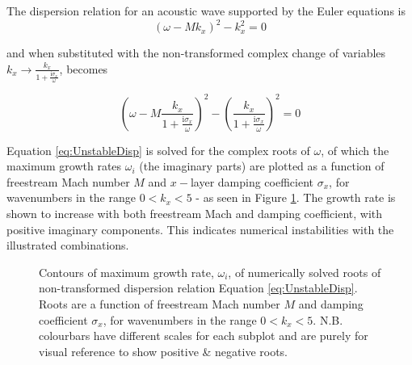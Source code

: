 The dispersion relation for an acoustic wave supported by the Euler equations is
\begin{equation}
    \left(\omega - M k_x \right)^2 - k_x^2 = 0
\end{equation}
 
and when substituted with the non-transformed complex change of variables $k_x \rightarrow \frac{k_x}{1 + \frac{\mathrm{i} \sigma_x}{\omega}}$, becomes
 
 \begin{equation} \label{eq:UnstableDisp}
     \left(\omega - M \frac{k_x}{1+\frac{\mathrm{i} \sigma_x}{\omega}} \right)^2 - \left(\frac{k_x}{1+\frac{\mathrm{i} \sigma_x}{\omega}}\right)^2=0
 \end{equation}
 
Equation \ref{eq:UnstableDisp} is solved for the complex roots of $\omega$, of which the maximum growth rates $\omega_i$ (the imaginary parts) are plotted as a function of freestream Mach number $M$ and $x-$layer damping coefficient $\sigma_x$, for wavenumbers in the range $0<k_x<5$ - as seen in Figure \ref{fig:UnstableSigmaxM}. The growth rate is shown to increase with both freestream Mach and damping coefficient, with positive imaginary components. This indicates numerical instabilities with the illustrated combinations.

\begin{figure}[h!]
\centering
{}
\caption{Contours of maximum growth rate, $\omega_{i}$, of numerically solved roots of non-transformed dispersion relation Equation \ref{eq:UnstableDisp}. Roots are a function of freestream Mach number $M$ and damping coefficient $\sigma_x$, for wavenumbers in the range $0 < k_{x} < 5$. N.B. colourbars have different scales for each subplot and are purely for visual reference to show positive \& negative roots.}
\label{fig:UnstableSigmaxM}
\end{figure}

